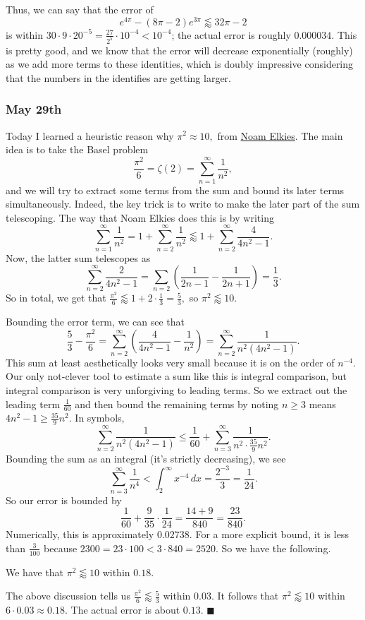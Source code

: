 Thus, we can say that the error of
\[e^{4\pi}-(8\pi-2)e^{3\pi}\lessapprox32\pi-2\]
is within $30\cdot9\cdot20^{-5}=\frac{27}{2^5}\cdot10^{-4}<10^{-4}$; the actual error is roughly $0.000034.$ This is pretty good, and we know that the error will decrease exponentially (roughly) as we add more terms to these identities, which is doubly impressive considering that the numbers in the identifies are getting larger.

\subsubsection{May 29th}
Today I learned a heuristic reason why $\pi^2\approx10,$ from \href{http://people.math.harvard.edu/~elkies/Misc/pi10.pdf}{Noam Elkies}. The main idea is to take the Basel problem
\[\frac{\pi^2}6=\zeta(2)=\sum_{n=1}^\infty\frac1{n^2},\]
and we will try to extract some terms from the sum and bound its later terms simultaneously. Indeed, the key trick is to write to make the later part of the sum telescoping. The way that Noam Elkies does this is by writing
\[\sum_{n=1}^\infty\frac1{n^2}=1+\sum_{n=2}^\infty\frac1{n^2}\lessapprox1+\sum_{n=2}^\infty\frac4{4n^2-1}.\]
Now, the latter sum telescopes as
\[\sum_{n=2}^\infty\frac2{4n^2-1}=\sum_{n=2}\left(\frac1{2n-1}-\frac1{2n+1}\right)=\frac13.\]
So in total, we get that $\frac{\pi^2}6\lessapprox1+2\cdot\frac13=\frac53,$ so $\pi^2\lessapprox10.$

Bounding the error term, we can see that
\[\frac53-\frac{\pi^2}6=\sum_{n=2}^\infty\left(\frac4{4n^2-1}-\frac1{n^2}\right)=\sum_{n=2}^\infty\frac1{n^2\left(4n^2-1\right)}.\]
This sum at least aesthetically looks very small because it is on the order of $n^{-4}.$ Our only not-clever tool to estimate a sum like this is integral comparison, but integral comparison is very unforgiving to leading terms. So we extract out the leading term $\frac1{60}$ and then bound the remaining terms by noting $n\ge3$ means $4n^2-1\ge\frac{35}9n^2.$ In symbols,
\[\sum_{n=2}^\infty\frac1{n^2\left(4n^2-1\right)}\le\frac1{60}+\sum_{n=3}^\infty\frac1{n^2\cdot\frac{35}9n^2}.\]
Bounding the sum as an integral (it's strictly decreasing), we see
\[\sum_{n=3}^\infty\frac1{n^4}<\int_2^\infty x^{-4}\,dx=\frac{2^{-3}}3=\frac1{24}.\]
So our error is bounded by
\[\frac1{60}+\frac9{35}\cdot\frac1{24}=\frac{14+9}{840}=\frac{23}{840}.\]
Numerically, this is approximately $0.02738.$ For a more explicit bound, it is less than $\frac3{100}$ because $2300=23\cdot100<3\cdot840=2520.$ So we have the following.
\begin{proposition}
    We have that $\pi^2\lessapprox10$ within $0.18.$
\end{proposition}
The above discussion tells us $\frac{\pi^2}6\lessapprox\frac53$ within $0.03.$ It follows that $\pi^2\lessapprox10$ within $6\cdot0.03\approx0.18.$ The actual error is about $0.13.$ $\blacksquare$

